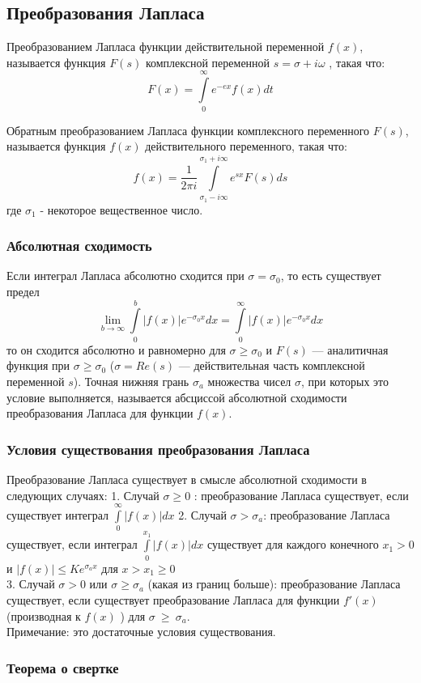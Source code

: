 \documentclass[12pt, a6paper]{extarticle}
\begin{document}
\subsection{Преобразования Лапласа}
Преобразованием Лапласа функции действительной переменной $f(x)$, называется функция $F(s)$ комплексной переменной $s =\sigma + i \omega $ , такая что:
$$ F(x) = \int\limits^\infty_0{e^{-ex}f(x)dt} $$

Обратным преобразованием Лапласа функции комплексного переменного $F(s)$, называется функция $f(x)$ действительного переменного, такая что:
$$ f(x) = \frac{1}{2\pi i}\int\limits^{\sigma_1+i\infty}_{\sigma_1-i\infty}{e^{sx}F(s)ds} $$
где $\sigma_1$ - некоторое вещественное число.	
\subsubsection{Абсолютная сходимость}
Если интеграл Лапласа абсолютно сходится при $\sigma=\sigma_0$, то есть существует предел
$$ \lim_{b\to\infty}{\int\limits^b_0{|f(x)|e^{-\sigma_0x}dx}} = \int\limits_0^{\infty}{|f(x)|e^{-\sigma_0x}dx} $$
то он сходится абсолютно и равномерно для $\sigma \geq \sigma_0$ и $F(s)$ — аналитичная функция при $\sigma \geq \sigma_0$ ($\sigma = Re(s) $ — действительная часть комплексной переменной $s$). Точная нижняя грань $\sigma_a$ множества чисел $\sigma$, при которых это условие выполняется, называется абсциссой абсолютной сходимости преобразования Лапласа для функции $f(x)$.

\subsubsection{Условия существования преобразования Лапласа}
Преобразование Лапласа существует в смысле абсолютной сходимости в следующих случаях:
1. Случай $\sigma \geq 0 $ : преобразование Лапласа существует, если существует интеграл
$\int\limits^\infty_0{|f(x)|dx}$
2. Случай $\sigma>\sigma_a$: преобразование Лапласа существует, если интеграл $\int\limits^{x_1}_0{|f(x)|dx}$ существует для каждого конечного $x_1>0$ и $|f(x)|\leq Ke^{\sigma_ax}$ для $x>x_1\geq0$ \\
3. Случай $\sigma>0$ или $\sigma\geq\sigma_a$ (какая из границ больше): преобразование Лапласа существует, если существует преобразование Лапласа для функции $f'(x)$ (производная к $f(x)$ ) для $\sigma~\geq~\sigma_a$. \\
Примечание: это достаточные условия существования.
\subsubsection{Теорема о свертке}
   
\end{document}
